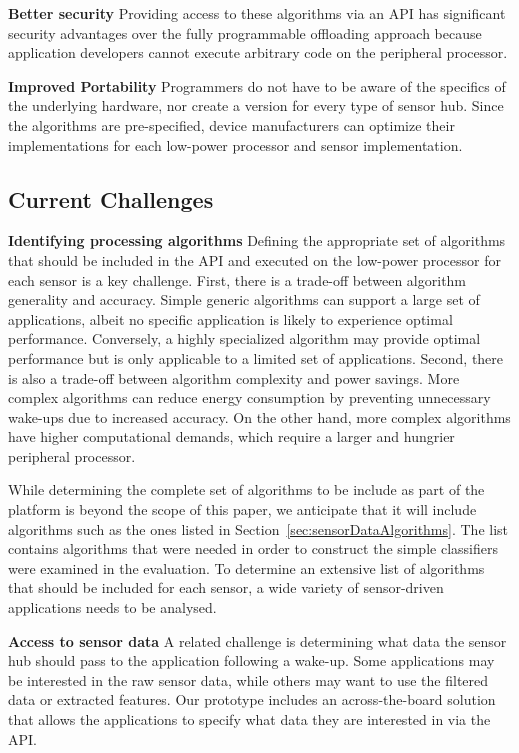 {\bf Better security} Providing access to these algorithms via
  an API has significant security advantages over the fully
  programmable offloading approach because application developers
  cannot execute arbitrary code on the peripheral processor. 


{\bf Improved Portability} Programmers do not have to be
  aware of the specifics of the underlying hardware, nor create a version
  for every type of sensor hub. Since the algorithms are
  pre-specified, device manufacturers can optimize their
  implementations for each low-power processor and sensor
  implementation.



\subsection{Current Challenges}
\label{sec:currentChallenges}

{\bf Identifying processing algorithms} Defining the appropriate
set of algorithms that should be included in the API and executed on
the low-power processor for each sensor is a key challenge. First,
there is a trade-off between algorithm generality and accuracy.
Simple generic algorithms can support a large set of
applications, albeit no specific application is likely to experience
optimal performance.  Conversely, a highly specialized algorithm may
provide optimal performance but is only applicable to a limited set of
applications.  Second, there is also a trade-off between algorithm
complexity and power savings.  More complex algorithms can reduce
energy consumption by preventing unnecessary wake-ups due to increased
accuracy.  On the other hand, more complex algorithms have higher
computational demands, which require a larger and hungrier peripheral
processor.  

While determining the complete set of 
algorithms to be include as part of the platform is beyond the
scope of this paper, we anticipate that it will include algorithms 
such as the ones listed in Section~\ref{sec:sensorDataAlgorithms}.
The list contains algorithms that were needed in order to construct
the simple classifiers were examined in the evaluation.  To 
determine an extensive list of 
algorithms that should be included for each sensor, a wide variety
of sensor-driven applications needs to be analysed.


{\bf Access to sensor data} A related challenge is determining what
data the sensor hub should pass to the application following a
wake-up.  Some applications may be interested in the raw sensor data,
while others may want to use the filtered data or extracted features.
Our prototype includes an across-the-board solution that allows the 
applications to specify what data they are interested in via the API.


